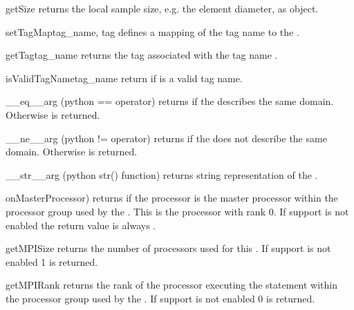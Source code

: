 \begin{methoddesc}[Domain]{getSize}{}
returns the local sample size, e.g. the element diameter, as \Data object.
\end{methoddesc}

\begin{methoddesc}[Domain]{setTagMap}{tag_name, tag}
defines a mapping of the tag name   to the . 
\end{methoddesc}
\begin{methoddesc}[Domain]{getTag}{tag_name}
returns the tag associated with the tag name .
\end{methoddesc}
\begin{methoddesc}[Domain]{isValidTagName}{tag_name}
return \True if  is a valid tag name.
\end{methoddesc}

\begin{methoddesc}[Domain]{__eq__}{arg}
(python == operator) returns \True if the \Domain {} describes the same domain. Otherwise
\False is returned.
\end{methoddesc}

\begin{methoddesc}[Domain]{__ne__}{arg}
(python != operator) returns \True if the \Domain {} does not describe the same domain. 
Otherwise \False is returned.
\end{methoddesc}

\begin{methoddesc}[Domain]{__str__}{arg}
(python str() function) returns string representation of the \Domain.
\end{methoddesc}

\begin{methoddesc}[Domain]{onMasterProcessor)}{}
returns \True if the processor is the master processor within 
the \MPI processor group used by the \Domain. This is the processor with rank 0.
If \MPI support is not enabled the return value is always \True.
\end{methoddesc}

\begin{methoddesc}[Domain]{getMPISize}{}
 returns the number of \MPI processors used for this \Domain. If \MPI support is not enabled
1 is returned.
\end{methoddesc}

\begin{methoddesc}[Domain]{getMPIRank}{}
 returns the rank of the processor executing the statement 
within the  \MPI processor group used by the \Domain. 
If \MPI support is not enabled 0 is returned.
\end{methoddesc}

